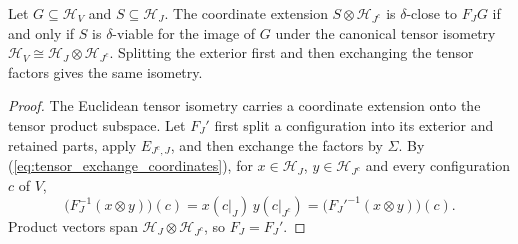 \begin{lemma}
    \label{thm:regional_tensor_viability}
    \leanok
    Let $G\subseteq\mathcal H_V$ and $S\subseteq\mathcal H_J$.
    The coordinate extension $S\otimes\mathcal H_{J^c}$ is
    $\delta$-close to $F_JG$ if and only if $S$ is $\delta$-viable for
    the image of $G$ under the canonical tensor isometry
    $\mathcal H_V\cong\mathcal H_J\otimes\mathcal H_{J^c}$.
    Splitting the exterior first and then exchanging the tensor factors
    gives the same isometry.
\end{lemma}
\begin{proof}\leanok
    The Euclidean tensor isometry carries a coordinate extension onto the
    tensor product subspace. Let $F_J'$ first split a configuration into
    its exterior and retained parts, apply $E_{J^c,J}$, and then exchange
    the factors by $\Sigma$. By (\ref{eq:tensor_exchange_coordinates}),
    for $x\in\mathcal H_J$, $y\in\mathcal H_{J^c}$ and every configuration
    $c$ of $V$,
    \[
        \bigl(F_J^{-1}(x\otimes y)\bigr)(c)=x(c|_J)\,y(c|_{J^c})
        =\bigl({F_J'}^{-1}(x\otimes y)\bigr)(c).
    \]
    Product vectors span $\mathcal H_J\otimes\mathcal H_{J^c}$, so
    $F_J=F_J'$.
\end{proof}


